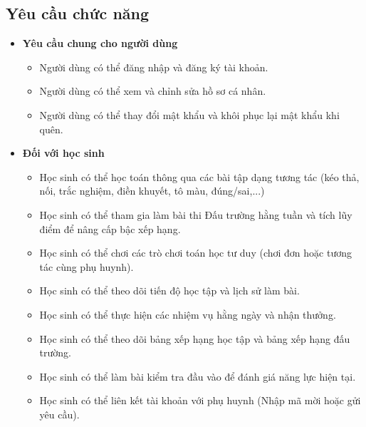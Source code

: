 \subsection{Yêu cầu chức năng}
\begin{itemize}
    \item \textbf{Yêu cầu chung cho người dùng}
    \begin{itemize}
        \item Người dùng có thể đăng nhập và đăng ký tài khoản.
        \item Người dùng có thể xem và chỉnh sửa hồ sơ cá nhân.
        \item Người dùng có thể thay đổi mật khẩu và khôi phục lại mật khẩu khi quên.
    \end{itemize}
    
    \item \textbf{Đối với học sinh}
    \begin{itemize}
        \item Học sinh có thể học toán thông qua các bài tập dạng tương tác (kéo thả, nối, trắc nghiệm, điền khuyết, tô màu, đúng/sai,...)
        \item Học sinh có thể tham gia làm bài thi Đấu trường hằng tuần và tích lũy điểm để nâng cấp bậc xếp hạng.
        \item Học sinh có thể chơi các trò chơi toán học tư duy (chơi đơn hoặc tương tác cùng phụ huynh).
        \item Học sinh có thể theo dõi tiến độ học tập và lịch sử làm bài.
        \item Học sinh có thể thực hiện các nhiệm vụ hằng ngày và nhận thưởng.
        \item Học sinh có thể theo dõi bảng xếp hạng học tập và bảng xếp hạng đấu trường.
        \item Học sinh có thể làm bài kiểm tra đầu vào để đánh giá năng lực hiện tại.
        \item Học sinh có thể liên kết tài khoản với phụ huynh (Nhập mã mời hoặc gửi yêu cầu).
    \end{itemize}
    

\end{itemize}
